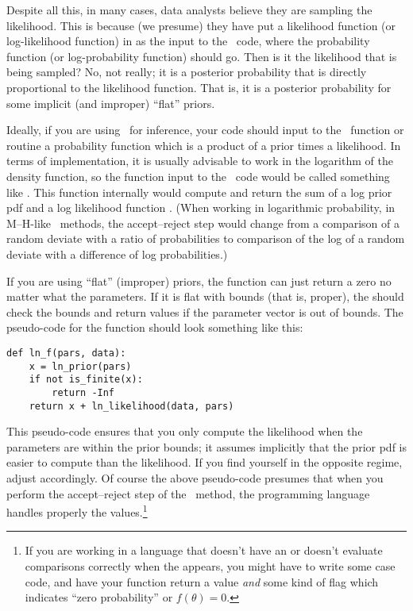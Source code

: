 \documentclass[12pt,twoside,pdftex]{article}
\newcommand{\MCMC}{\acronym{MCMC}}
\newcommand{\pars}{\theta}
\begin{document}
Despite all this, in many cases,
  data analysts believe they are sampling the likelihood.
This is because (we presume) they have put a likelihood function
  (or log-likelihood function)
  in as the input to the \MCMC\ code, where the probability function
  (or log-probability function) should go.
Then is it the likelihood that is being sampled?
No, not really;
  it is a posterior probability that is directly proportional to the likelihood function.
That is, it is a posterior probability for some implicit (and improper) ``flat'' priors.

Ideally, if you are using \MCMC\ for inference, your code should input
to the \MCMC\ function or routine a probability function which is a
product of a prior times a likelihood.
In terms of implementation, it is usually advisable to work in the
logarithm of the density function, so the function input to the \MCMC\ code
would be called something like .
This function  internally would compute and return the
sum of a log prior pdf  and a log likelihood function
.
(When working in logarithmic probability, in M--H-like \MCMC\ methods,
the accept--reject step would change from a comparison of a random
deviate with a ratio of probabilities to comparison of the log of a
random deviate with a difference of log probabilities.)

If you are using ``flat'' (improper) priors, the 
function can just return a zero no matter what the parameters.
If it is flat with bounds (that is, proper), the 
should check the bounds and return  values if the parameter
vector is out of bounds.
The pseudo-code for the  function should look something
like this:
\begin{verbatim}
def ln_f(pars, data):
    x = ln_prior(pars)
    if not is_finite(x):
        return -Inf
    return x + ln_likelihood(data, pars)
\end{verbatim}
This pseudo-code ensures that you only compute the likelihood when the
parameters are within the prior bounds; it assumes implicitly that the
prior pdf is easier to compute than the likelihood.
If you find yourself in the opposite regime, adjust accordingly.
Of course the above pseudo-code presumes that when you perform the
accept--reject step of the \MCMC\ method, the programming language handles
properly the  values.\footnote{If you are working in a language
that doesn't have an  or doesn't evaluate comparisons correctly
when the  appears, you might have to write some case code, and
have your  function return a value \emph{and} some kind of flag
which indicates ``zero probability'' or $f(\pars)=0$.}
\end{document}
